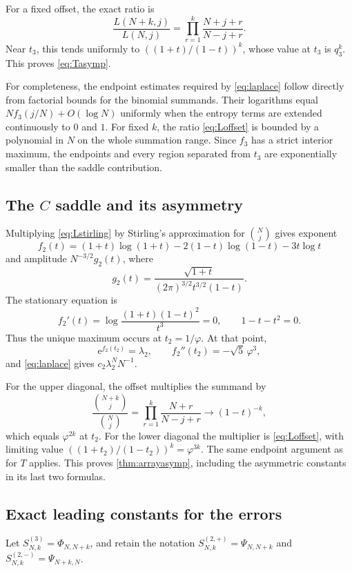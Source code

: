 \documentclass[11pt,letterpaper]{article}
\numberwithin{equation}{section}
\theoremstyle{definition}
\newcommand{\ee}{\mathrm e}
\begin{document}
For a fixed offset, the exact ratio is
\begin{equation}\label{eq:Loffset}
 \frac{L(N+k,j)}{L(N,j)}
 =\prod_{r=1}^{k}\frac{N+j+r}{N-j+r}.
\end{equation}
Near $t_3$, this tends uniformly to
$((1+t)/(1-t))^k$, whose value at $t_3$ is $q_3^k$.
This proves \eqref{eq:Tasymp}.

For completeness, the endpoint estimates required by \eqref{eq:laplace}
follow directly from factorial bounds for the binomial summands.
Their logarithms equal $Nf_3(j/N)+O(\log N)$ uniformly when the entropy
terms are extended continuously to $0$ and $1$. For fixed $k$, the
ratio \eqref{eq:Loffset} is bounded by a polynomial in $N$ on the
whole summation range. Since $f_3$ has a strict interior maximum,
the endpoints and every region separated from $t_3$ are exponentially
smaller than the saddle contribution.

\subsection{The \texorpdfstring{$C$}{C} saddle and its asymmetry}

Multiplying \eqref{eq:Lstirling} by Stirling's approximation for
$\binom Nj$ gives exponent
\[
 f_2(t)=(1+t)\log(1+t)-2(1-t)\log(1-t)-3t\log t
\]
and amplitude $N^{-3/2}g_2(t)$, where
\[
 g_2(t)=\frac{\sqrt{1+t}}{(2\pi)^{3/2}t^{3/2}(1-t)}.
\]
The stationary equation is
\[
 f_2'(t)=\log\frac{(1+t)(1-t)^2}{t^3}=0,
 \qquad 1-t-t^2=0.
\]
Thus the unique maximum occurs at $t_2=1/\varphi$. At that point,
\[
 \ee^{f_2(t_2)}=\lambda_2,\qquad
 f_2''(t_2)=-\sqrt5\,\varphi^3,
\]
and \eqref{eq:laplace} gives $c_2\lambda_2^N N^{-1}$.

For the upper diagonal, the offset multiplies the summand by
\[
 \frac{\binom{N+k}{j}}{\binom Nj}
 =\prod_{r=1}^{k}\frac{N+r}{N-j+r}
 \longrightarrow(1-t)^{-k},
\]
which equals $\varphi^{2k}$ at $t_2$. For the lower diagonal the
multiplier is \eqref{eq:Loffset}, with limiting value
$((1+t_2)/(1-t_2))^k=\varphi^{3k}$. The same endpoint argument as
for $T$ applies. This proves \cref{thm:arrayasymp}, including the
asymmetric constants in its last two formulas.

\subsection{Exact leading constants for the errors}

Let $S^{(3)}_{N,k}=\Phi_{N,N+k}$, and retain the notation
$S^{(2,+)}_{N,k}=\Psi_{N,N+k}$ and $S^{(2,-)}_{N,k}=\Psi_{N+k,N}$.
\end{document}
